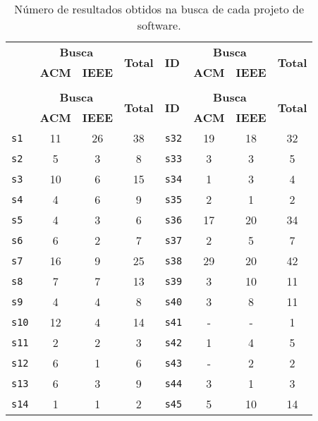 \begin{longtable}{ l c c c | l c c c }
\caption{Número de resultados obtidos na busca de cada projeto de software.}
\label{search-table} \\
  \hline
  \hhline{ l c c c | l c c c |}
  \endfirsthead
  \hhline{ l c c c | l c c c |}
  \hline
   \multirow{2}{*}{\textbf{ID}} & \multicolumn{2}{c}{{\bf Busca}} & \multirow{2}{*}{\textbf{Total}} & \multirow{2}{*}{\textbf{ID}} & \multicolumn{2}{c}{{\bf Busca}} & \multirow{2}{*}{\textbf{Total}} \\
   & \textbf{ACM} & \textbf{IEEE} & & & \textbf{ACM} & \textbf{IEEE} & \\
  \hline
  \hhline{ l c c c | l c c c |}
  \endhead
  \hhline{----|----}
  \multicolumn{8}{c}{continua na próxima página} \\
  \hhline{----|----} \endfoot
  \hhline{----|----} \endlastfoot
   \multirow{2}{*}{\textbf{ID}} & \multicolumn{2}{c}{{\bf Busca}} & \multirow{2}{*}{\textbf{Total}} & \multirow{2}{*}{\textbf{ID}} & \multicolumn{2}{c}{{\bf Busca}} & \multirow{2}{*}{\textbf{Total}} \\
   & \textbf{ACM} & \textbf{IEEE} & & & \textbf{ACM} & \textbf{IEEE} & \\
  \hline
\texttt{s1} & 11 & 26 & 38 & \texttt{s32} & 19 & 18 & 32 \\
\texttt{s2} & 5 & 3 & 8 & \texttt{s33} & 3 & 3 & 5 \\
\texttt{s3} & 10 & 6 & 15 & \texttt{s34} & 1 & 3 & 4 \\
\texttt{s4} & 4 & 6 & 9 & \texttt{s35} & 2 & 1 & 2 \\
\texttt{s5} & 4 & 3 & 6 & \texttt{s36} & 17 & 20 & 34 \\
\texttt{s6} & 6 & 2 & 7 & \texttt{s37} & 2 & 5 & 7 \\
\texttt{s7} & 16 & 9 & 25 & \texttt{s38} & 29 & 20 & 42 \\
\texttt{s8} & 7 & 7 & 13 & \texttt{s39} & 3 & 10 & 11 \\
\texttt{s9} & 4 & 4 & 8 & \texttt{s40} & 3 & 8 & 11 \\
\texttt{s10} & 12 & 4 & 14 & \texttt{s41} & - & - & 1 \\
\texttt{s11} & 2 & 2 & 3 & \texttt{s42} & 1 & 4 & 5 \\
\texttt{s12} & 6 & 1 & 6 & \texttt{s43} & - & 2 & 2 \\
\texttt{s13} & 6 & 3 & 9 & \texttt{s44} & 3 & 1 & 3 \\
\texttt{s14} & 1 & 1 & 2 & \texttt{s45} & 5 & 10 & 14 \\

\end{longtable}
